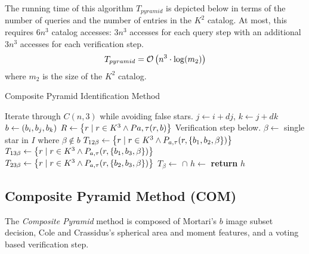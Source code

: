 The running time of this algorithm $T_{pyramid}$ is depicted below in terms of the number of queries and the number
of entries in the $K^2$ catalog.
At most, this requires $6n^3$ catalog accesses: $3n^3$ accesses for each query step with an additional $3n^3$ accesses
for each verification step.
\begin{equation}
    T_{pyramid} = \mathcal{O} \left( n^3 \cdot \log( m_2 ) \right)
\end{equation}
where $m_2$ is the size of the $K^2$ catalog.


\begin{algorithm}
    \caption{Composite Pyramid Identification Method}\label{algorithm:compositePyramid}
    \begin{algorithmic}[1]
        \LineComment Iterate through $C(n, 3)$ while avoiding false stars.
        \State $j \gets i + dj$, $k \gets j + dk$
        \State $b \gets (b_i, b_j, b_k)$
        \State $R \gets \left\{  r \mid r \in K^3 \land P{a, \tau}(r, b)  \right\}$
        \LineComment Verification step below.
        \State $\beta \gets $ single star in $I$ where $\beta \notin b$
        \State $T_{12\beta} \gets \left\{  r \mid r \in K^3 \land P_{a, \tau}(r, \left\{ b_1, b_2, \beta \right\}) \right\}$
        \State $T_{13\beta} \gets \left\{  r \mid r \in K^3 \land P_{a, \tau}(r, \left\{ b_1, b_3, \beta \right\}) \right\}$
        \State $T_{23\beta} \gets \left\{  r \mid r \in K^3 \land P_{a, \tau} (r, \left\{ b_2, b_3, \beta \right\}) \right\}$
        \State $T_\beta \gets $  $\cap$ 
        \State $h \gets$ 
        \invalidBijection
        \State \textbf{return} $h$
        \EndIf
        \EndIf
        \EndIf
        \EndFor
        \EndFor
        \EndFor
        \EndFunction
    \end{algorithmic}
\end{algorithm}

\subsection{Composite Pyramid Method (COM)}\label{subsec:compositePyramidMethod}
The \textit{Composite Pyramid} method is composed of Mortari's $b$ image subset decision, Cole and Crassidus's
spherical area and moment features, and a voting based verification step.


